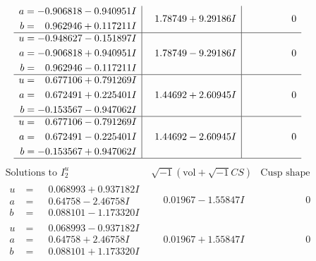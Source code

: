 \documentclass[1p]{elsarticle_modified}
\theoremstyle{definition}
\newcommand{\I}{\sqrt{-1}}
\begin{document}
$$\begin{array}{c|c|c}
\begin{aligned}
a &= -0.906818 - 0.940951 I \\
b &= \phantom{-}0.962946 + 0.117211 I\end{aligned}
 & \phantom{-}1.78749 + 9.29186 I & \phantom{-0.000000 } 0 \\ \hline\begin{aligned}
u &= -0.948627 - 0.151897 I \\
a &= -0.906818 + 0.940951 I \\
b &= \phantom{-}0.962946 - 0.117211 I\end{aligned}
 & \phantom{-}1.78749 - 9.29186 I & \phantom{-0.000000 } 0 \\ \hline\begin{aligned}
u &= \phantom{-}0.677106 + 0.791269 I \\
a &= \phantom{-}0.672491 + 0.225401 I \\
b &= -0.153567 - 0.947062 I\end{aligned}
 & \phantom{-}1.44692 + 2.60945 I & \phantom{-0.000000 } 0 \\ \hline\begin{aligned}
u &= \phantom{-}0.677106 - 0.791269 I \\
a &= \phantom{-}0.672491 - 0.225401 I \\
b &= -0.153567 + 0.947062 I\end{aligned}
 & \phantom{-}1.44692 - 2.60945 I & \phantom{-0.000000 } 0\\
 \hline 
 \end{array}$$\newpage$$\begin{array}{c|c|c}  
\text{Solutions to }I^u_{2}& \I (\text{vol} + \sqrt{-1}CS) & \text{Cusp shape}\\
 \hline 
\begin{aligned}
u &= \phantom{-}0.068993 + 0.937182 I \\
a &= \phantom{-}0.64758 - 2.46758 I \\
b &= \phantom{-}0.088101 - 1.173320 I\end{aligned}
 & \phantom{-}0.01967 - 1.55847 I & \phantom{-0.000000 } 0 \\ \hline\begin{aligned}
u &= \phantom{-}0.068993 - 0.937182 I \\
a &= \phantom{-}0.64758 + 2.46758 I \\
b &= \phantom{-}0.088101 + 1.173320 I\end{aligned}
 & \phantom{-}0.01967 + 1.55847 I & \phantom{-0.000000 } 0 \\ \hline\begin{aligned}

\end{aligned}
\end{array}$$
\end{document}
